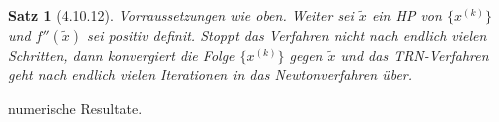 \documentclass[ngerman,halfparskip]{scrartcl}
\newtheorem*{satz}{Satz}
\theoremstyle{definition}
\begin{document}
\begin{satz}[4.10.12]
Vorraussetzungen wie oben. Weiter sei $\tilde x$ ein HP von $\{x^{(k)}\}$ und $f''(\tilde x)$ sei positiv definit. Stoppt das Verfahren nicht nach endlich vielen Schritten, dann konvergiert die Folge $\{x^{(k)}\}$ gegen $\tilde x$ und das TRN-Verfahren geht nach endlich vielen Iterationen in das Newtonverfahren über.
\end{satz}

numerische Resultate.
\end{document}
